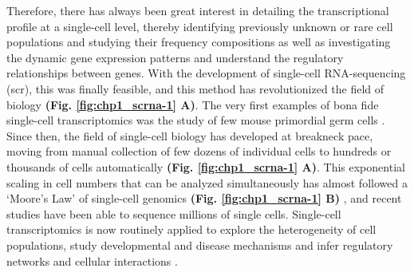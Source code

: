 Therefore, there has always been great interest in detailing the transcriptional profile at a single-cell level, thereby identifying previously unknown or rare cell populations and studying their frequency compositions as well as investigating the dynamic gene expression patterns and understand the regulatory relationships between genes. With the development of single-cell RNA-sequencing (\gls{scr}), this was finally feasible, and this method has revolutionized the field of biology \textbf{(Fig. \ref{fig:chp1_scrna-1} A)}. The very first examples of bona fide single-cell transcriptomics was the study of few mouse primordial germ cells \textbf{\cite{tang_mrna-seq_2009}}. Since then, the field of single-cell biology has developed at breakneck pace, moving from manual collection of few dozens of individual cells to hundreds or thousands of cells automatically \textbf{(Fig. \ref{fig:chp1_scrna-1} A)}. This exponential scaling in cell numbers that can be analyzed simultaneously has almost followed a `Moore’s Law' of single-cell genomics \textbf{(Fig. \ref{fig:chp1_scrna-1} B)} \textbf{\cite{aldridge_single_2020}}, and recent studies have been able to sequence millions of single cells. Single-cell transcriptomics is now routinely applied to explore the heterogeneity of cell populations, study developmental \textbf{\cite{cao_single-cell_2019,la_manno_molecular_2021}} and disease mechanisms \textbf{\cite{jordao_single-cell_2019,he_single-cell_2021}} and infer regulatory networks \textbf{\cite{wang_cell-type-specific_2020,fei_systematic_2022}} and cellular interactions \textbf{\cite{cherry_computational_2021,shamsi_comprehensive_2023}}. 



